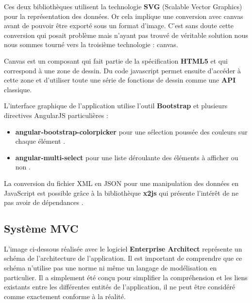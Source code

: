 \documentclass [a4paper,11pt]{article}
\begin{document}
Ces deux bibliothèques utilisent la technologie \textbf{SVG} (Scalable Vector Graphics) pour la représentation des données. Or cela implique une conversion avec canvas avant de pouvoir être exporté sous un format d’image. C’est sans doute cette conversion qui posait problème mais n’ayant pas trouvé de véritable solution nous nous sommes tourné vers la troisième technologie : canvas.
\newline

Canvas est un composant qui fait partie de la spécification \textbf{HTML5} et qui correspond à une zone de dessin. Du code javascript permet ensuite d’accéder à cette zone et d’utiliser toute une série de fonctions de dessin comme une \textbf{API} classique.
\newline

L’interface graphique de l’application utilise l’outil \textbf{Bootstrap} et plusieurs directives AngularJS particulières :
\newline

\begin{itemize}
 \item \textbf{angular-bootstrap-colorpicker} pour une sélection poussée des couleurs sur chaque élément \cite{colorpicker13}.
 \item \textbf{angular-multi-select} pour une liste déroulante des éléments à afficher ou non \cite{select14}.
 \newline
\end{itemize}

La conversion du fichier XML en JSON pour une manipulation des données en JavaScript est possible grâce à la bibliothèque \textbf{x2js} qui présente l’intérêt de ne pas avoir de dépendances \cite{x2js14}.
\newline

\subsection{Système MVC}
L’image ci-dessous réalisée avec le logiciel \textbf{Enterprise Architect} représente un schéma de l’architecture de l’application. Il est important de comprendre que ce schéma n’utilise pas une norme ni même un langage de modélisation en particulier. Il a simplement été conçu pour simplifier la compréhension et les liens existants entre les différentes entités de l’application, il ne peut être considéré comme exactement conforme à la réalité.
\newline
\end{document}
